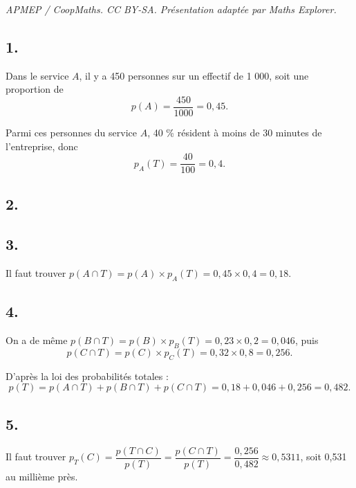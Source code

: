 \documentclass[10pt]{article}
\begin{document}
\noindent\textit{APMEP / CoopMaths. CC BY-SA. Présentation adaptée par Maths Explorer.}\par\medskip
\subsection*{1.}
	
	Dans le service \(A\), il y a 450 personnes sur un effectif de 1 000, soit une proportion de
	\[
	p(A) = \dfrac{450}{1000} = 0,45.
	\]
	
	Parmi ces personnes du service \(A\), 40 \% résident à moins de 30 minutes de l’entreprise, donc
	\[
	p_A(T) = \dfrac{40}{100} = 0,4.
	\]
	
	\subsection*{2.}
	
	\begin{center}
\end{center}
	
	\subsection*{3.}
	
	Il faut trouver \(p(A \cap T) = p(A) \times p_A(T) = 0,45 \times 0,4 = 0,18\).
	
	\subsection*{4.}
	
	On a de même \(p(B \cap T) = p(B) \times p_B(T) = 0,23 \times 0,2 = 0,046\), puis
	\[
	p(C \cap T) = p(C) \times p_C(T) = 0,32 \times 0,8 = 0,256.
	\]
	
	D’après la loi des probabilités totales :
	\[
	p(T) = p(A \cap T) + p(B \cap T) + p(C \cap T) = 0,18 + 0,046 + 0,256 = 0,482.
	\]
	
	\subsection*{5.}
	
	Il faut trouver \(p_T(C) = \dfrac{p(T \cap C)}{p(T)} = \dfrac{p(C \cap T)}{p(T)} = \dfrac{0,256}{0,482} \approx 0,5311\), soit 0,531 au millième près.
\end{document}
